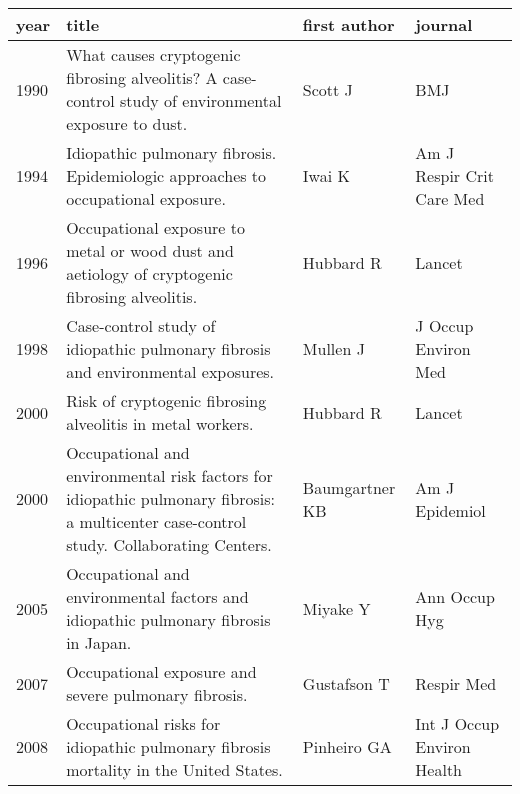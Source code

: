 \documentclass[a4paper,12pt]{article}
\begin{document}
\begin{table}
    \begin{tabular}{lp{6cm}p{3cm}p{5cm}}
    \textbf{year} & \textbf{title} &      \textbf{first author} &        \textbf{journal} \\
    \midrule
            1990    &                                    What causes cryptogenic fibrosing alveolitis? A case-control study of environmental exposure to dust. &                    Scott J &                         BMJ \\
            1994    &                                                        Idiopathic pulmonary fibrosis. Epidemiologic approaches to occupational exposure. &                     Iwai K &   Am J Respir Crit Care Med \\
            1996    &                                           Occupational exposure to metal or wood dust and aetiology of cryptogenic fibrosing alveolitis. &                  Hubbard R &                      Lancet \\
            1998    &                                                         Case-control study of idiopathic pulmonary fibrosis and environmental exposures. &                   Mullen J &         J Occup Environ Med \\
            2000    &                                                                               Risk of cryptogenic fibrosing alveolitis in metal workers. &                  Hubbard R &                      Lancet \\
            2000    &  Occupational and environmental risk factors for idiopathic pulmonary fibrosis: a multicenter case-control study. Collaborating Centers. &             Baumgartner KB &              Am J Epidemiol \\
            2005    &                                                       Occupational and environmental factors and idiopathic pulmonary fibrosis in Japan. &                   Miyake Y &               Ann Occup Hyg \\
            2007    &                                                                                     Occupational exposure and severe pulmonary fibrosis. &                Gustafson T &                  Respir Med \\
            2008    &                                                     Occupational risks for idiopathic pulmonary fibrosis mortality in the United States. &                Pinheiro GA &  Int J Occup Environ Health \\

\end{tabular}
\end{table}
\end{document}
